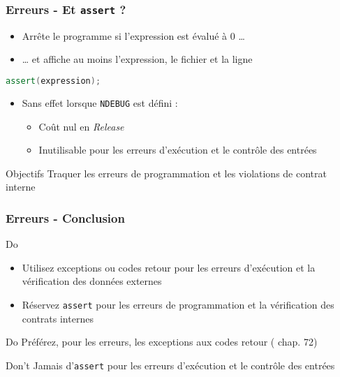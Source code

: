 \documentclass[C++.tex]{subfiles}
\begin{document}
\begin{frame}[fragile]
	\frametitle{Erreurs - Et \lstinline|assert| ?}
	\begin{itemize}
		\item Arrête le programme si l'expression est évalué à 0 \ldots
		\item \ldots{} et affiche au moins l'expression, le fichier et la ligne
	\end{itemize}

	\begin{lstlisting}[language=C++]
assert(expression);\end{lstlisting}

	\begin{itemize}
		\item Sans effet lorsque \lstinline|NDEBUG| est défini :
		\begin{itemize}
			\item Coût nul en \textit{Release}
			\item Inutilisable pour les erreurs d'exécution et le contrôle des entrées
		\end{itemize}
	\end{itemize}

	\begin{block}{Objectifs}
		Traquer les erreurs de programmation et les violations de contrat interne
	\end{block}
\end{frame}

\begin{frame}
	\frametitle{Erreurs - Conclusion}
	\begin{exampleblock}{Do}
		\begin{itemize}
			\item Utilisez exceptions ou codes retour pour les erreurs d'exécution et la vérification des données externes
			\item Réservez \lstinline|assert| pour les erreurs de programmation et la vérification des contrats internes
		\end{itemize}
	\end{exampleblock}

	\begin{exampleblock}{Do}
		Préférez, pour les erreurs, les exceptions aux codes retour (\cite{coding} chap. 72)

	\end{exampleblock}

	\begin{alertblock}{Don't}
		Jamais d'\lstinline|assert| pour les erreurs d'exécution et le contrôle des entrées
	\end{alertblock}
\end{frame}
\end{document}
